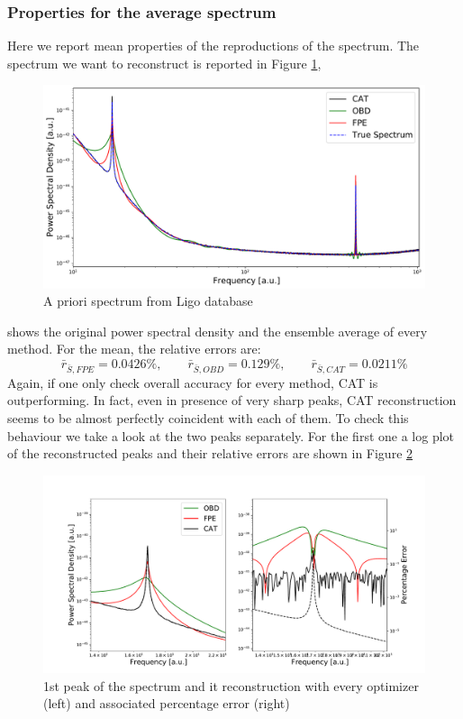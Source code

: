 \documentclass[twocolumn,showpacs,preprintnumbers,nofootinbib,prd,
superscriptaddress,10pt]{revtex4-1}
\begin{document}
\subsubsection{Properties for the average spectrum}
Here we report mean properties of the reproductions of the spectrum. The spectrum we want to reconstruct is reported in Figure \ref{fig:ligospectrum},
\begin{figure}
    \centering
  
        \includegraphics[width = \linewidth]{Images/LIGOsimulate/PSD.pdf}
        \caption{A priori spectrum from Ligo database}
        \label{fig:ligospectrum}
\end{figure}
shows the original power spectral density and the ensemble average of every method. For the mean, the relative errors are: 
\begin{equation}
    \bar r_{\bar S, FPE} = 0.0426\%, \qquad \bar r_{\bar S, OBD} = 0.129\%, \qquad \bar r_{\bar S, CAT} = 0.0211\%
\end{equation}
Again, if one only check overall accuracy for every method, CAT is outperforming. In fact, even in presence of very sharp peaks, CAT reconstruction seems to be almost perfectly coincident with each of them. To check this behaviour we take a look at the two peaks separately. For the first one a log plot of the reconstructed peaks and their relative errors are shown in Figure \ref{fig:ligo1peak} 
\begin{figure}[t]
        \includegraphics[width = \linewidth]{Images/LIGOsimulate/1stPeakComparison.pdf}
        \caption{1st peak of the spectrum and it reconstruction with every optimizer (left) and associated percentage error (right)}
        \label{fig:ligo1peak}
\end{figure}
\end{document}
